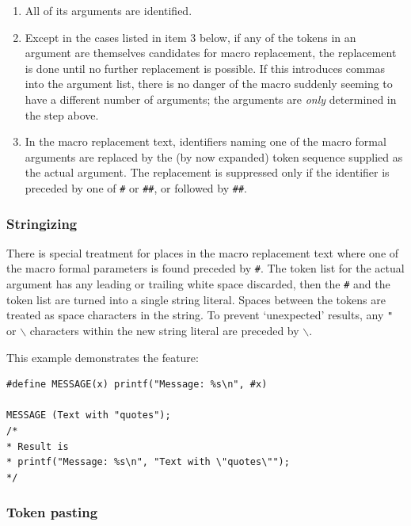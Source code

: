     \begin{enumerate}
     \item All of its arguments are identified.

     \item Except in the cases listed in item 3 below, if any of the tokens in
      an argument are themselves candidates for macro replacement, the
      replacement is done until no further replacement is possible. If
      this introduces commas into the argument list, there is no danger
      of the macro suddenly seeming to have a different number of
      arguments; the arguments are \textit{only} determined in the step
      above.

     \item In the macro replacement text, identifiers naming one of the macro
      formal arguments are replaced by the (by now expanded) token
      sequence supplied as the actual argument. The replacement is
      suppressed only if the identifier is preceded by one
      of \texttt{\#} or \texttt{\#\#}, or followed
      by \texttt{\#\#}.
    \end{enumerate}

   

   \subsubsection{Stringizing}
    

    There is special treatment for places in the macro replacement text
     where one of the macro formal parameters is found preceded by
     \texttt{\#}. The token list for the actual argument has any leading
     or trailing white space discarded, then the \texttt{\#} and the
     token list are turned into a single string literal. Spaces between the
     tokens are treated as space characters in the string. To prevent
     `unexpected' results, any \texttt{"}
     or \texttt{$\backslash$} characters within the new string literal are
     preceded by \texttt{$\backslash$}.


    This example demonstrates the feature:


    \begin{Verbatim}
#define MESSAGE(x) printf("Message: %s\n", #x)

MESSAGE (Text with "quotes");
/*
* Result is
* printf("Message: %s\n", "Text with \"quotes\"");
*/
\end{Verbatim}

   

   \subsubsection{Token pasting}
    

